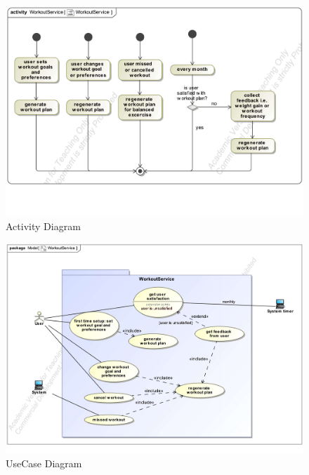 \documentclass{article}
\begin{document}
		\begin{figure}[h!]
		    	\centering
		   	\captionsetup{labelformat=empty}
		   	\caption{Activity Diagram}
		    	\includegraphics[width=\textwidth, angle=0]{Marc/workout/WorkoutServiceActivity.pdf}
		\end{figure}
		\clearpage
		\begin{figure}[h!]
			\centering
			\captionsetup{labelformat=empty}
			\caption{UseCase Diagram}
		    	\includegraphics[width=\textwidth, angle=0]{Marc/workout/WorkoutServiceUseCase.pdf}
		\end{figure}
		\clearpage
\end{document}
